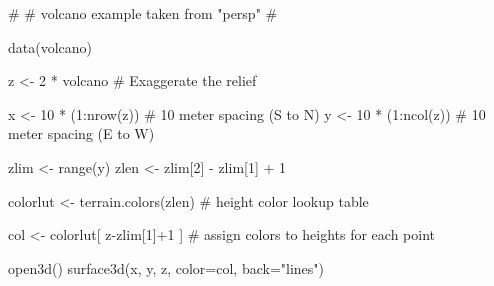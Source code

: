 \documentclass{article}
\begin{document}
\begin{Examples}
\begin{ExampleCode}

#
# volcano example taken from "persp"
#

data(volcano)

z <- 2 * volcano        # Exaggerate the relief

x <- 10 * (1:nrow(z))   # 10 meter spacing (S to N)
y <- 10 * (1:ncol(z))   # 10 meter spacing (E to W)

zlim <- range(y)
zlen <- zlim[2] - zlim[1] + 1

colorlut <- terrain.colors(zlen) # height color lookup table

col <- colorlut[ z-zlim[1]+1 ] # assign colors to heights for each point

open3d()
surface3d(x, y, z, color=col, back="lines")

\end{ExampleCode}
\end{Examples}
\end{document}
